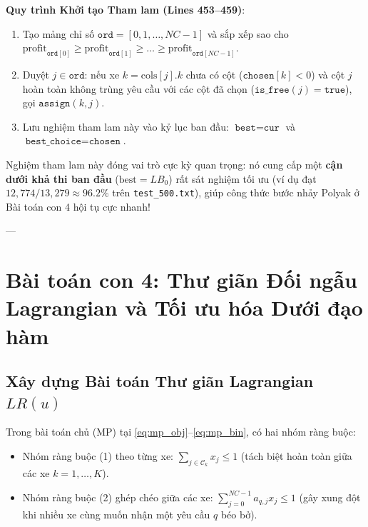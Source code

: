 \documentclass[11pt,a4paper]{article}
\theoremstyle{definition}
\begin{document}
\textbf{Quy trình Khởi tạo Tham lam (Lines 453--459)}:
\begin{enumerate}[leftmargin=1.5em]
    \item Tạo mảng chỉ số $\texttt{ord} = [0, 1, \dots, NC-1]$ và sắp xếp sao cho $\text{profit}_{\texttt{ord}[0]} \ge \text{profit}_{\texttt{ord}[1]} \ge \dots \ge \text{profit}_{\texttt{ord}[NC-1]}$.
    \item Duyệt $j \in \texttt{ord}$: nếu xe $k = \text{cols}[j].k$ chưa có cột ($\texttt{chosen}[k] < 0$) và cột $j$ hoàn toàn không trùng yêu cầu với các cột đã chọn ($\texttt{is\_free}(j) = \texttt{true}$), gọi $\texttt{assign}(k, j)$.
    \item Lưu nghiệm tham lam này vào kỷ lục ban đầu: $\texttt{best} = \texttt{cur}$ và $\texttt{best\_choice} = \texttt{chosen}$.
\end{enumerate}
Nghiệm tham lam này đóng vai trò cực kỳ quan trọng: nó cung cấp một \textbf{cận dưới khả thi ban đầu} ($\text{best} = LB_0$) rất sát nghiệm tối ưu (ví dụ đạt $12,774 / 13,279 \approx 96.2\%$ trên \texttt{test\_500.txt}), giúp công thức bước nhảy Polyak ở Bài toán con 4 hội tụ cực nhanh!

---

\section{Bài toán con 4: Thư giãn Đối ngẫu Lagrangian và Tối ưu hóa Dưới đạo hàm}

\subsection{Xây dựng Bài toán Thư giãn Lagrangian $LR(u)$}
Trong bài toán chủ (MP) tại \eqref{eq:mp_obj}--\eqref{eq:mp_bin}, có hai nhóm ràng buộc:
\begin{itemize}[leftmargin=1.5em]
    \item Nhóm ràng buộc (1) theo từng xe: $\sum_{j \in \mathcal{C}_k} x_j \le 1$ (tách biệt hoàn toàn giữa các xe $k = 1, \dots, K$).
    \item Nhóm ràng buộc (2) ghép chéo giữa các xe: $\sum_{j=0}^{NC-1} a_{q, j} x_j \le 1$ (gây xung đột khi nhiều xe cùng muốn nhận một yêu cầu $q$ béo bở).
\end{itemize}
\end{document}
